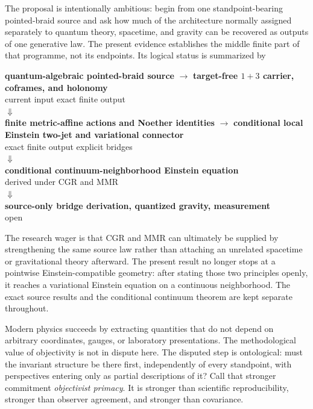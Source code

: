 \documentclass[11pt]{article}
\theoremstyle{definition}
\theoremstyle{remark}
\begin{document}
The proposal is intentionally ambitious: begin from one standpoint-bearing pointed-braid source and ask how much of the architecture normally assigned separately to quantum theory, spacetime, and gravity can be recovered as outputs of one generative law. The present evidence establishes the middle finite part of that programme, not its endpoints. Its logical status is summarized by
\begin{center}
\begin{minipage}{0.96\linewidth}
\centering
\small
\textbf{quantum-algebraic pointed-braid source}
$\longrightarrow$
\textbf{target-free $1+3$ carrier, coframes, and holonomy}\\[-0.15em]
{\footnotesize current input \hspace{16em} exact finite output}\\[0.25em]
$\Downarrow$\\[-0.1em]
\textbf{finite metric-affine actions and Noether identities}
$\longrightarrow$
\textbf{conditional local Einstein two-jet and variational connector}\\[-0.15em]
{\footnotesize exact finite output \hspace{6em} explicit bridges}\\[0.25em]
$\Downarrow$\\[-0.1em]
\textbf{conditional continuum-neighborhood Einstein equation}\\[-0.15em]
{\footnotesize derived under CGR and MMR}\\[0.25em]
$\Downarrow$\\[-0.1em]
\textbf{source-only bridge derivation, quantized gravity, measurement}\\[-0.15em]
{\footnotesize open}
\end{minipage}
\end{center}
The research wager is that CGR and MMR can ultimately be supplied by strengthening the same source law rather than attaching an unrelated spacetime or gravitational theory afterward. The present result no longer stops at a pointwise Einstein-compatible geometry: after stating those two principles openly, it reaches a variational Einstein equation on a continuous neighborhood. The exact source results and the conditional continuum theorem are kept separate throughout.

Modern physics succeeds by extracting quantities that do not depend on arbitrary coordinates, gauges, or laboratory presentations. The methodological value of objectivity is not in dispute here. The disputed step is ontological: must the invariant structure be there first, independently of every standpoint, with perspectives entering only as partial descriptions of it? Call that stronger commitment \emph{objectivist primacy}. It is stronger than scientific reproducibility, stronger than observer agreement, and stronger than covariance.
\end{document}
